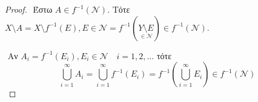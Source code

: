 \begin{proof}

$ $\newline
Έστω $A \in f^{-1}(\mathcal{N})$. Τότε $X\setminus A = X\setminus f^{-1}(E), E\in \mathcal{N} = f^{-1}(\underset{\in \mathcal{N}}{Y\setminus E}) \in f^{-1}(\mathcal{N})$.

$ $\newline
Αν $A_i = f^{-1}(E_i), E_i \in \mathcal{N} \quad i=1,2,\ldots$ τότε
$$\bigcup\limits_{i=1}^{\infty} A_i = \bigcup\limits_{i=1}^{\infty} f^{-1}(E_i) = f^{-1} \left(\bigcup\limits_{i=1}^{\infty} E_i \right) \in f^{-1} (\mathcal{N}) $$
\end{proof}






